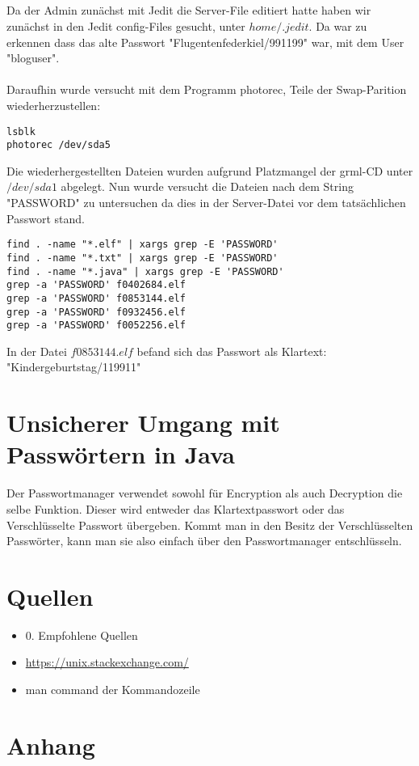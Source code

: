 \documentclass[12pt]{article}
\theoremstyle{plain}
\begin{document}
\subsection{}
Da der Admin zunächst mit Jedit die Server-File editiert hatte haben wir zunächst in den Jedit config-Files gesucht, unter $home/.jedit$. Da war zu erkennen dass das alte Passwort "Flugentenfederkiel/991199" war, mit dem User "bloguser". \\ \\ Daraufhin wurde versucht mit dem Programm photorec, Teile der Swap-Parition wiederherzustellen:
\begin{lstlisting}
lsblk
photorec /dev/sda5
\end{lstlisting}
Die wiederhergestellten Dateien wurden aufgrund Platzmangel der grml-CD unter $/dev/sda1$ abgelegt. Nun wurde versucht die Dateien nach dem String "PASSWORD" zu untersuchen da dies in der Server-Datei vor dem tatsächlichen Passwort stand.
\begin{lstlisting}
find . -name "*.elf" | xargs grep -E 'PASSWORD'
find . -name "*.txt" | xargs grep -E 'PASSWORD'
find . -name "*.java" | xargs grep -E 'PASSWORD'
grep -a 'PASSWORD' f0402684.elf
grep -a 'PASSWORD' f0853144.elf
grep -a 'PASSWORD' f0932456.elf
grep -a 'PASSWORD' f0052256.elf
\end{lstlisting}
In der Datei $f0853144.elf$ befand sich das Passwort als Klartext: "Kindergeburtstag/119911"
\section{Unsicherer Umgang mit Passwörtern in Java}
Der Passwortmanager verwendet sowohl für Encryption als auch Decryption die selbe Funktion. Dieser wird entweder das Klartextpasswort oder das Verschlüsselte Passwort übergeben. Kommt man in den Besitz der Verschlüsselten Passwörter, kann man sie also einfach über den Passwortmanager entschlüsseln.
\section{Quellen}
\begin{itemize}
\item 0. Empfohlene Quellen
\item \url{https://unix.stackexchange.com/}
\item man command der Kommandozeile
\end{itemize}
\section{Anhang}
\end{document}
